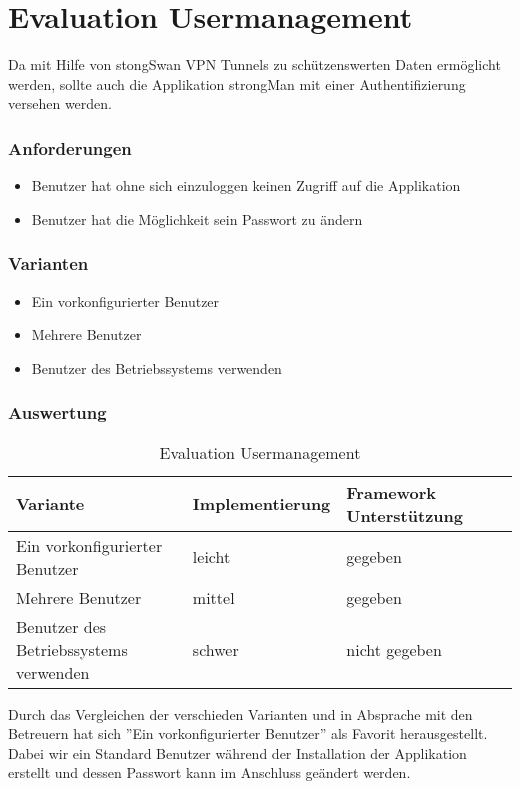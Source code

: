 \section{Evaluation Usermanagement}
Da mit Hilfe von stongSwan VPN Tunnels zu schützenswerten Daten ermöglicht werden, sollte auch die Applikation strongMan mit einer Authentifizierung versehen werden.
\subsubsection{Anforderungen}
\begin{itemize}
	\item Benutzer hat ohne sich einzuloggen keinen Zugriff auf die Applikation
	\item Benutzer hat die Möglichkeit sein Passwort zu ändern
\end{itemize}

\subsubsection{Varianten}
\begin{itemize}
	\item Ein vorkonfigurierter Benutzer
	\item Mehrere Benutzer
	\item Benutzer des Betriebssystems verwenden
\end{itemize}
\subsubsection{Auswertung}
\begin{table}[H]
\centering
    \begin{tabular}{|l|l|l|l|}
    \hline
    \rowcolor{lightblue}
    Variante & Implementierung & Framework Unterstützung   \\ \hline
	Ein vorkonfigurierter Benutzer	&	leicht	& gegeben		\\ \hline
		Mehrere Benutzer	&	mittel	& gegeben		\\ \hline
		Benutzer des Betriebssystems verwenden	&	schwer	& nicht gegeben	\\ 
		\hline	
	\end{tabular}
    \caption[Evaluation Usermanagement]{Evaluation Usermanagement}
\end{table}

Durch das Vergleichen der verschieden Varianten und in Absprache mit den Betreuern hat sich ''Ein vorkonfigurierter Benutzer'' als Favorit herausgestellt. Dabei wir ein Standard Benutzer während der Installation der Applikation erstellt und dessen Passwort kann im Anschluss geändert werden.

